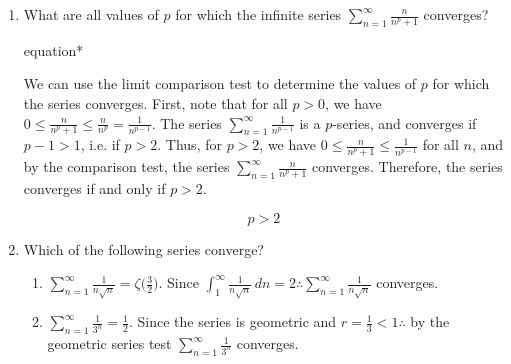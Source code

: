 \documentclass[12pt]{article}
\begin{document}
\begin{enumerate}
\begin{enumerate}[label=\Roman*.]
	      	\item $\sum_{n=1}^{\infty} e^{-n}$
			  \begin{empheq}[box=\tcbhighmath]{equation*}
				\parbox{6in}{Since $\sum_{n=1}^{\infty} e^{-n}$ is a geometric series with first term $e^{-1}$ and common ratio $r=e^{-1}<1$, it converges by the geometric series test.}
			  \end{empheq}
	      	\item $\sum_{n=1}^{\infty} \frac{n+1}{n^2+n}$
	      \end{enumerate}
		  \begin{empheq}[box=\tcbhighmath]{equation*}
			\parbox{6in}{We can use the limit comparison test with the series $\sum_{n=1}^{\infty} \frac{1}{n}$ to show that $\sum_{n=1}^{\infty} \frac{n+1}{n^2+n}$ diverges. Note that $\frac{n+1}{n^2+n} = \frac{n+1}{n(n+1)} = \frac{1}{n}$ for all $n\geq 1$. Since $\sum_{n=1}^{\infty} \frac{1}{n}$ diverges by the $p$-series test with $p=1<2$, we have that $\sum_{n=1}^{\infty} \frac{n+1}{n^2+n}$ also diverges by the limit comparison test.}
		\end{empheq}
		$$\boxed{\text{I and II only}}$$
	\item What are all values of $p$ for which the infinite series $\sum_{n=1}^{\infty} \frac{n}{n^p+1}$ converges?
	\begin{empheq}[box = \tcbhighmath]{equation*}
		\parbox{6in}{We can use the limit comparison test to determine the values of $p$ for which the series converges. First, note that for all $p > 0$, we have $0 \leq \frac{n}{n^p+1} \leq \frac{n}{n^p} = \frac{1}{n^{p-1}}.$ The series $\sum_{n=1}^{\infty} \frac{1}{n^{p-1}}$ is a $p$-series, and converges if $p-1 > 1$, i.e. if $p > 2$. Thus, for $p > 2$, we have $0 \leq \frac{n}{n^p+1} \leq \frac{1}{n^{p-1}}$ for all $n$, and by the comparison test, the series $\sum_{n=1}^{\infty} \frac{n}{n^p+1}$ converges. Therefore, the series converges if and only if $p > 2$.}
	  \end{empheq}
	  $$\boxed{p > 2}$$
	\item Which of the following series converge?
	      \begin{enumerate}[label=\Roman*.]
	      	\item $\sum_{n=1}^{\infty} \frac{1}{n\sqrt{n}} = \zeta\big( \frac{3}{2}\big)$. Since $\int_{1}^{\infty} \frac{1}{n\sqrt{n}} \, dn = 2 \therefore\sum_{n=1}^{\infty} \frac{1}{n\sqrt{n}}$ converges.
	      	\item $\sum_{n=1}^{\infty} \frac{1}{3^n} = \frac{1}{2}$. Since the series is geometric and $r= \frac{1}{3} < 1 \therefore$ by the geometric series test  $\sum_{n=1}^{\infty} \frac{1}{3^n}$ converges.

\end{enumerate}
\end{enumerate}
\end{document}
